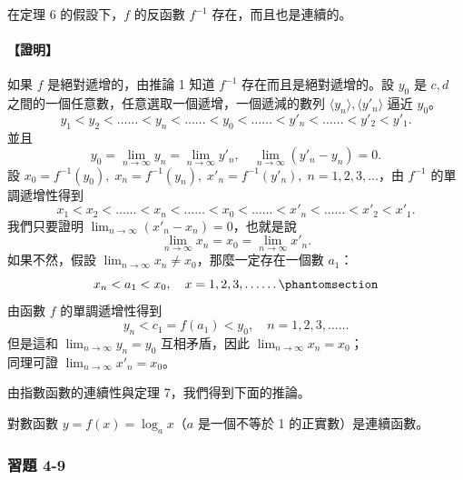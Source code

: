 \begin{theorem}
在定理 6 的假設下，$f$ 的反函數 $f^{-1}$ 存在，而且也是連續的。
\end{theorem}
\paragraph{【證明】} 如果 $f$ 是絕對遞增的，由推論 1 知道 $f^{-1}$ 存在而且是絕對遞增的。設 $y_0$ 是 $c, d$ 之間的一個任意數，任意選取一個遞增，一個遞減的數列 $\langle y_n \rangle, \langle y'_n \rangle$ 逼近 $y_0$。
\[
y_1 < y_2 < \dots\dots < y_n < \dots\dots < y_0 < \dots\dots < y'_n < \dots\dots < y'_2 < y'_1.
\]
並且
\[
y_0 = \lim_{n\to\infty} y_n = \lim_{n\to\infty} y'_n,\quad \lim_{n\to\infty}(y'_n - y_n) = 0.
\]
設 $x_0 = f^{-1}(y_0),\; x_n = f^{-1}(y_n),\; x'_n = f^{-1}(y'_n),\; n=1, 2, 3, \dots$，由 $f^{-1}$ 的單調遞增性得到
\[
x_1 < x_2 < \dots\dots < x_n < \dots\dots < x_0 < \dots\dots < x'_n < \dots\dots < x'_2 < x'_1.
\]
我們只要證明 $\lim_{n\to\infty}(x'_n - x_n) = 0$，也就是說
\[
\lim_{n\to\infty} x_n = x_0 = \lim_{n\to\infty} x'_n.
\]
如果不然，假設 $\lim_{n\to\infty} x_n \neq x_0$，那麼一定存在一個數 $a_1$：
\[
x_n < a_1 < x_0,\quad x = 1, 2, 3, \dots\dots\phantomsection\label{note:b2-ch4-p109-index-x}
\]
由函數 $f$ 的單調遞增性得到
\[
y_n < c_1 = f(a_1) < y_0,\quad n=1, 2, 3, \dots\dots
\]
但是這和 $\lim_{n\to\infty} y_n = y_0$ 互相矛盾，因此 $\lim_{n\to\infty} x_n = x_0$；\\
同理可證 $\lim_{n\to\infty} x'_n = x_0$。

由指數函數的連續性與定理 7，我們得到下面的推論。

\begin{prop}[推論]
對數函數 $y = f(x) = \log_a x$（$a$ 是一個不等於 1 的正實數）是連續函數。
\end{prop}

\subsubsection*{習題 4-9}

